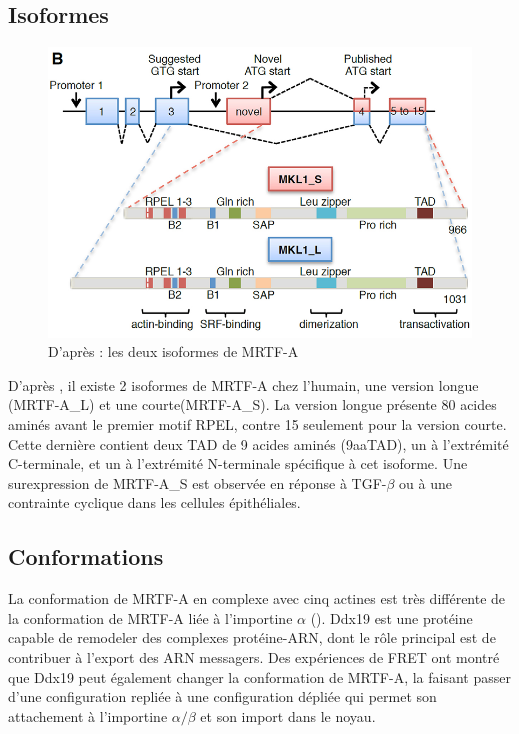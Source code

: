 \documentclass{report}
\begin{document}
 \subsection{Isoformes}
 \begin{figure}[h!]
 \includegraphics[scale=0.5]{MRTF_isoformes.png}
 \caption{D'après \cite{scharenberg_tgf-_2014} : les deux isoformes de MRTF-A}
 
 \end{figure}
 D'après \cite{scharenberg_tgf-_2014}, il existe 2 isoformes de MRTF-A chez l'humain, une version longue (MRTF-A\_L) et une courte(MRTF-A\_S). La version longue présente 80 acides aminés avant le premier motif RPEL, contre 15 seulement pour la version courte. Cette dernière contient deux TAD de 9 acides aminés (9aaTAD), un à l'extrémité C-terminale, et un à l'extrémité N-terminale spécifique à cet isoforme. Une surexpression de MRTF-A\_S est observée en réponse à TGF-$\beta$ ou à une contrainte cyclique dans les cellules épithéliales. 
 
 
\subsection{Conformations}

La conformation de MRTF-A en complexe avec cinq actines est très différente de la conformation de MRTF-A liée à l'importine $\alpha$ (\cite{hirano_sensing_2011}). 
Ddx19 est une protéine capable de remodeler des complexes protéine-ARN, dont le rôle principal est de contribuer à l'export des ARN messagers. Des expériences de FRET ont montré que Ddx19 peut également changer la conformation de MRTF-A, la faisant passer d'une configuration repliée à une configuration dépliée qui permet son attachement à l'importine $\alpha/\beta$ et son import dans le noyau. 
\end{document}
